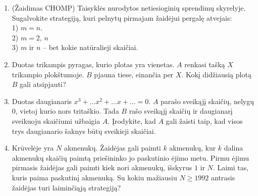 \begin{enumerate}
  \item(Žaidimas CHOMP) Taisyklės nurodytos netiesioginių sprendimų skyrelyje.
    Sugalvokite strategiją, kuri pelnytų pirmajam žaidėjui pergalę atvejais: \\
    1) $m=n$. \\
    2) $m=2$, $n$ \\ %
    3) $m$ ir $n$ – bet kokie natūralieji skaičiai.

  \item Duotas trikampis pyragas, kurio plotas yra vienetas. $A$ renkasi tašką
    $X$ trikampio plokštumoje. $B$ pjauna tiese, einančia per $X$. Kokį
    didžiausią plotą $B$ gali atsipjauti?

  \item Duotas daugianaris $x^3+\dots x^2+\dots x+ \dots=0$. $A$ parašo
    sveikąjį skaičių, nelygų $0$, vietoj kurio nors tritaškio. Tada $B$ rašo
    sveikąjį skaičių ir daugianarį sveikuoju skaičiumi užbaigia $A$.
    Įrodykite, kad $A$ gali žaisti taip, kad visos trys daugianario šaknys būtų
    sveikieji skaičiai.

  \item {} Krūvelėje yra $N$ akmenukų.
    Žaidėjas gali paimti $k$ akmenukų, kur $k$ dalina akmenukų skaičių paimtą
    priešininko jo paskutinio ėjimo metu. Pirmu ėjimu pirmasis žaidėjas gali
    paimti kiek nori akmenukų, išskyrus $1$ ir $N$. Laimi tas, kuris paima
    paskutinį akmenuką. Su kokiu mažiausiu $N\geq 1992$ antrasis žaidėjas
    turi laiminčiąją strategiją?


\end{enumerate}
